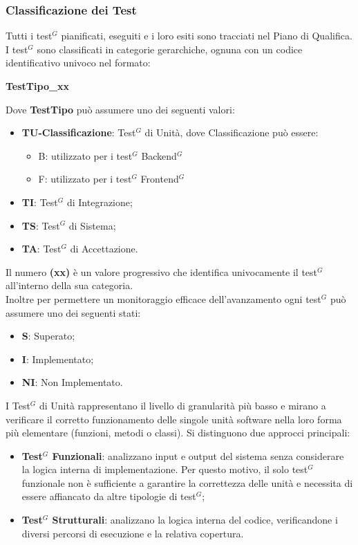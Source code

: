 \subsubsection{Classificazione dei Test}
Tutti i test$^G$ pianificati, eseguiti e i loro esiti sono tracciati nel Piano di Qualifica.\\
I test$^G$ sono classificati in categorie gerarchiche, ognuna con un codice identificativo univoco nel formato:
\begin{center}
    \textbf{TestTipo\_xx}
\end{center}
Dove \textbf{TestTipo} può assumere uno dei seguenti valori:
\begin{itemize}[itemsep=3pt, parsep=1pt, label=$\scriptstyle\bullet$]
    \item \textbf{TU-Classificazione}: Test$^G$ di Unità, dove Classificazione può essere:
    \begin{itemize}
    	\item B: utilizzato per i test$^G$ Backend$^G$
    	\item F: utilizzato per i test$^G$ Frontend$^G$
    \end{itemize}
    \item \textbf{TI}: Test$^G$ di Integrazione;
    \item \textbf{TS}: Test$^G$ di Sistema;
    \item \textbf{TA}: Test$^G$ di Accettazione.
\end{itemize}
Il numero \textbf{(xx)} è un valore progressivo che identifica univocamente il test$^G$ all'interno della sua categoria. \\
Inoltre per permettere un monitoraggio efficace dell'avanzamento ogni test$^G$ può assumere uno dei seguenti stati:
\begin{itemize}[itemsep=3pt, parsep=1pt, label=$\scriptstyle\bullet$]
    \item \textbf{S}: Superato;
    \item \textbf{I}: Implementato;
    \item \textbf{NI}: Non Implementato.
\end{itemize}

I Test$^G$ di Unità rappresentano il livello di granularità più basso e mirano a verificare il corretto funzionamento delle singole unità software nella loro forma più elementare (funzioni, metodi o classi).
Si distinguono due approcci principali:
\begin{itemize}
    \item \textbf{Test$^G$ Funzionali}: analizzano input e output del sistema senza considerare la logica interna di implementazione. Per questo motivo, il solo test$^G$ funzionale non è sufficiente a garantire la correttezza delle unità e necessita di essere affiancato da altre tipologie di test$^G$;
    \item \textbf{Test$^G$ Strutturali}: analizzano la logica interna del codice, verificandone i diversi percorsi di esecuzione e la relativa copertura.
\end{itemize}

